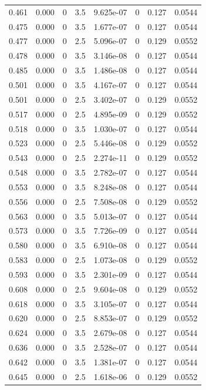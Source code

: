 \documentclass[preview]{standalone}
\begin{document}
{{{\begin{tabular}{L{1.2cm}C{1.2cm} C{0.3cm}C{0.5cm} C{1.4cm}C{1.4cm} C{1.4cm}C{1.4cm}}
  0.461  &  0.000  & 0     & 3.5 &  9.625e-07  & 0  & 0.127 &  0.0544   \\ 
  0.475  &  0.000  & 0     & 3.5 &  1.677e-07  & 0  & 0.127 &  0.0544   \\ 
  0.477  &  0.000  & 0     & 2.5 &  5.096e-07  & 0  & 0.129 &  0.0552   \\ 
  0.478  &  0.000  & 0     & 3.5 &  3.146e-08  & 0  & 0.127 &  0.0544   \\ 
  0.485  &  0.000  & 0     & 3.5 &  1.486e-08  & 0  & 0.127 &  0.0544   \\ 
  0.501  &  0.000  & 0     & 3.5 &  4.167e-07  & 0  & 0.127 &  0.0544   \\ 
  0.501  &  0.000  & 0     & 2.5 &  3.402e-07  & 0  & 0.129 &  0.0552   \\ 
  0.517  &  0.000  & 0     & 2.5 &  4.895e-09  & 0  & 0.129 &  0.0552   \\ 
  0.518  &  0.000  & 0     & 3.5 &  1.030e-07  & 0  & 0.127 &  0.0544   \\ 
  0.523  &  0.000  & 0     & 2.5 &  5.446e-08  & 0  & 0.129 &  0.0552   \\ 
  0.543  &  0.000  & 0     & 2.5 &  2.274e-11  & 0  & 0.129 &  0.0552   \\ 
  0.548  &  0.000  & 0     & 3.5 &  2.782e-07  & 0  & 0.127 &  0.0544   \\ 
  0.553  &  0.000  & 0     & 3.5 &  8.248e-08  & 0  & 0.127 &  0.0544   \\ 
  0.556  &  0.000  & 0     & 2.5 &  7.508e-08  & 0  & 0.129 &  0.0552   \\ 
  0.563  &  0.000  & 0     & 3.5 &  5.013e-07  & 0  & 0.127 &  0.0544   \\ 
  0.573  &  0.000  & 0     & 3.5 &  7.726e-09  & 0  & 0.127 &  0.0544   \\ 
  0.580  &  0.000  & 0     & 3.5 &  6.910e-08  & 0  & 0.127 &  0.0544   \\ 
  0.583  &  0.000  & 0     & 2.5 &  1.073e-08  & 0  & 0.129 &  0.0552   \\ 
  0.593  &  0.000  & 0     & 3.5 &  2.301e-09  & 0  & 0.127 &  0.0544   \\ 
  0.608  &  0.000  & 0     & 2.5 &  9.604e-08  & 0  & 0.129 &  0.0552   \\ 
  0.618  &  0.000  & 0     & 3.5 &  3.105e-07  & 0  & 0.127 &  0.0544   \\ 
  0.620  &  0.000  & 0     & 2.5 &  8.853e-07  & 0  & 0.129 &  0.0552   \\ 
  0.624  &  0.000  & 0     & 3.5 &  2.679e-08  & 0  & 0.127 &  0.0544   \\ 
  0.636  &  0.000  & 0     & 3.5 &  2.528e-07  & 0  & 0.127 &  0.0544   \\ 
  0.642  &  0.000  & 0     & 3.5 &  1.381e-07  & 0  & 0.127 &  0.0544   \\ 
  0.645  &  0.000  & 0     & 2.5 &  1.618e-06  & 0  & 0.129 &  0.0552   \\ 
\hline 
\end{tabular} 

}}}
\end{document}
